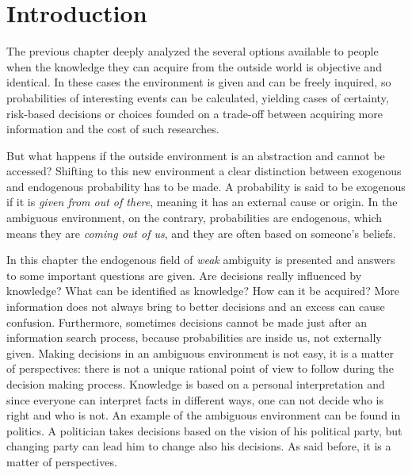 \section{Introduction}
The previous chapter deeply analyzed the several options available to people when the knowledge they can acquire from the outside world is objective and identical. In these cases the environment is given and can be freely inquired, so probabilities of interesting events can be calculated, yielding cases of certainty, risk-based decisions or choices founded on a trade-off between acquiring more information and the cost of such researches.

But what happens if the outside environment is an abstraction and cannot be accessed? Shifting to this new environment a clear distinction between exogenous and endogenous probability has to be made. A probability is said to be exogenous if it is \textit{given from out of there}, meaning it has an external cause or origin. In the ambiguous environment, on the contrary, probabilities are endogenous, which means they are \textit{coming out of us}, and they are often based on someone’s beliefs.

In this chapter the endogenous field of \textit{weak} ambiguity is presented and answers to some important questions are given. Are decisions really influenced by knowledge? What can be identified as knowledge? How can it be acquired? More information does not always bring to better decisions and an excess can cause confusion. Furthermore, sometimes decisions cannot be made just after an information search process, because probabilities are inside us, not externally given. Making decisions in an ambiguous environment is not easy, it is a matter of perspectives: there is not a unique rational point of view to follow during the decision making process.
Knowledge is based on a personal interpretation and since everyone can interpret facts in different ways, one can not decide who is right and who is not. An example of the ambiguous environment can be found in politics. A politician takes decisions based on the vision of his political party, but changing party can lead him to change also his decisions. As said before, it is a matter of perspectives.

